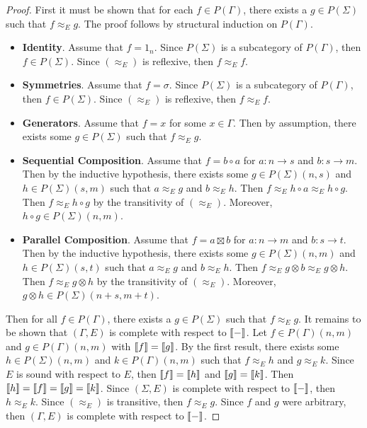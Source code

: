 \begin{proof}
    First it must be shown that for each $f \in P( \Gamma )$, there exists a $g \in P( \Sigma )$ such that $f \approx_E g$.
    The proof follows by structural induction on $P( \Gamma )$.
    \begin{itemize}
    \item \textbf{Identity}.
          Assume that $f = 1_n$.
          Since $P( \Sigma )$ is a subcategory of $P( \Gamma )$, then $f \in P( \Sigma )$.
          Since $( \approx_E )$ is reflexive, then $f \approx_E f$.
    \item \textbf{Symmetries}.
          Assume that $f = \sigma$.
          Since $P( \Sigma )$ is a subcategory of $P( \Gamma )$, then $f \in P( \Sigma )$.
          Since $( \approx_E )$ is reflexive, then $f \approx_E f$.
    \item \textbf{Generators}.
          Assume that $f = x$ for some $x \in \Gamma$.
          Then by assumption, there exists some $g \in P( \Sigma )$ such that $f \approx_E g$.
    \item \textbf{Sequential Composition}.
          Assume that $f = b \circ a$ for $a: n \to s$ and $b: s \to m$.
          Then by the inductive hypothesis, there exists some $g \in P( \Sigma )( n, s )$ and $h \in P( \Sigma )( s, m )$ such that $a \approx_E g$ and $b \approx_E h$.
          Then $f \approx_E h \circ a \approx_E h \circ g$.
          Then $f \approx_E h \circ g$ by the transitivity of $( \approx_E )$.
          Moreover, $h \circ g \in P( \Sigma )( n, m )$.
    \item \textbf{Parallel Composition}.
          Assume that $f = a \boxtimes b$ for $a: n \to m$ and $b: s \to t$.
          Then by the inductive hypothesis, there exists some $g \in P( \Sigma )( n, m )$ and $h \in P( \Sigma )( s, t )$ such that $a \approx_E g$ and $b \approx_E h$.
          Then $f \approx_E g \otimes b \approx_E g \otimes h$.
          Then $f \approx_E g \otimes h$ by the transitivity of $( \approx_E )$.
          Moreover, $g \otimes h \in P( \Sigma )( n + s, m + t )$.
    \end{itemize}
    Then for all $f \in P( \Gamma )$, there exists a $g \in P( \Sigma )$ such that $f \approx_E g$.
    It remains to be shown that $( \Gamma, E )$ is complete with respect to $\llbracket-\rrbracket$.
    Let $f \in P( \Gamma )( n, m )$ and $g \in P( \Gamma )( n, m )$ with $\llbracket f\rrbracket = \llbracket g\rrbracket$.
    By the first result, there exists some $h \in P( \Sigma )( n, m )$ and $k \in P( \Gamma )( n, m )$ such that $f \approx_E h$ and $g \approx_E k$.
    Since $E$ is sound with respect to $E$, then $\llbracket f\rrbracket =\llbracket h\rrbracket$ and $\llbracket g\rrbracket = \llbracket k\rrbracket$.
    Then $\llbracket h\rrbracket = \llbracket f\rrbracket = \llbracket g\rrbracket = \llbracket k\rrbracket$.
    Since $( \Sigma, E )$ is complete with respect to $\llbracket-\rrbracket$, then $h \approx_E k$.
    Since $( \approx_E )$ is transitive, then $f \approx_E g$.
    Since $f$ and $g$ were arbitrary, then $( \Gamma, E )$ is complete with respect to $\llbracket-\rrbracket$.
\end{proof}
